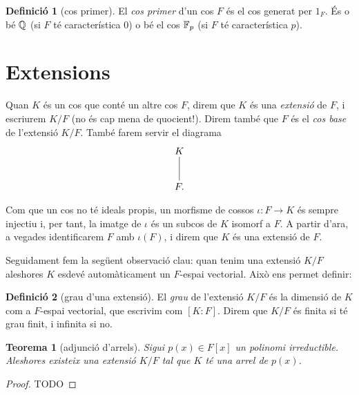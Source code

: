 \documentclass[
]{book}
\newtheorem{theorem}{Teorema}[chapter]
\theoremstyle{definition}
\newtheorem{definition}{Definició}[chapter]
\theoremstyle{definition}
\theoremstyle{definition}
\theoremstyle{definition}
\theoremstyle{remark}
\begin{document}
\begin{definition}[cos primer]
\protect\hypertarget{def:cos-primer}{}\label{def:cos-primer}El \emph{cos primer} d'un cos \(F\) és el cos generat per \(1_F\). És o bé \(\mathbb{Q}\) (si \(F\) té característica \(0\)) o bé el cos \(\mathbb{F}_p\)
(si \(F\) té característica \(p\)).
\end{definition}

\hypertarget{extensions}{%
\section{Extensions}\label{extensions}}

Quan \(K\) és un cos que conté un altre cos \(F\), direm que \(K\) és una \emph{extensió} de \(F\), i escriurem \(K/F\) (no és cap mena de quocient!). Direm també que
\(F\) és el \emph{cos base} de l'extensió \(K/F\). També farem servir
el diagrama
\[
\begin{xy}
\xymatrix{
  K\ar@{-}[d]\\
  F.
}
\end{xy}
\]

Com que un cos no té ideals propis, un morfisme de cossos \(\iota\colon F\to K\) és sempre injectiu i, per tant, la
imatge de \(\iota\) és un subcos de \(K\) isomorf a \(F\). A partir d'ara, a vegades identificarem \(F\) amb \(\iota(F)\), i direm
que \(K\) és una extensió de \(F\).

Seguidament fem la següent observació clau: quan tenim una extensió \(K/F\) aleshores \(K\) esdevé automàticament un \(F\)-espai vectorial. Això
ens permet definir:

\begin{definition}[grau d'una extensió]
\protect\hypertarget{def:grau-ext}{}\label{def:grau-ext}El \emph{grau} de l'extensió \(K/F\) és la dimensió de \(K\) com a \(F\)-espai vectorial, que escrivim com \([K\colon F]\). Direm que \(K/F\) és finita si té grau finit,
i infinita si no.
\end{definition}

\begin{theorem}[adjunció d'arrels]
\protect\hypertarget{thm:ext-arrel}{}\label{thm:ext-arrel}Sigui \(p(x)\in F[x]\) un polinomi irreductible. Aleshores existeix una extensió \(K/F\) tal que \(K\) té una arrel de \(p(x)\).
\end{theorem}

\begin{proof}
TODO
\end{proof}
\end{document}
